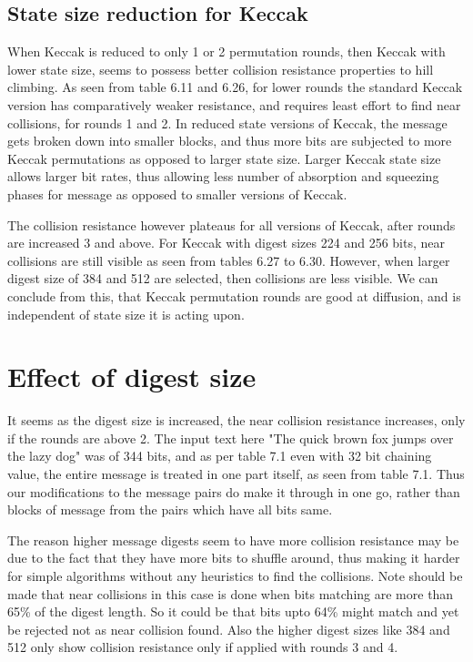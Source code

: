 \subsection{State size reduction for Keccak}

When Keccak is reduced to only 1 or 2 permutation rounds, then Keccak with lower state size, seems to possess better
collision resistance properties to hill climbing. As seen from table 6.11 and 6.26, for lower rounds the standard Keccak
version has comparatively weaker resistance, and requires least effort to find near collisions, for rounds 1 and 2.
In reduced state versions of Keccak, the message gets broken down into smaller blocks, and thus more bits are subjected
to more Keccak permutations as opposed to larger state size. Larger Keccak state size allows larger bit rates, thus
allowing less number of absorption and squeezing phases for message as opposed to smaller versions of Keccak.

The collision resistance however plateaus for all versions of Keccak, after rounds are increased 3 and above. For Keccak
with digest sizes 224 and 256 bits, near collisions are still visible as seen from tables 6.27 to 6.30. However, when 
larger digest size of 384 and 512 are selected, then collisions are less visible. We can conclude from this, that
Keccak permutation rounds are good at diffusion, and is independent of state size it is acting upon.

\section{Effect of digest size}

It seems as the digest size is increased, the near collision resistance increases, only if the rounds are above 2. The
input text here "The quick brown fox jumps over the lazy dog" was of 344 bits, and as per table 7.1 even with 32 bit
chaining value, the entire message is treated in one part itself, as seen from table 7.1. Thus our modifications to 
the message pairs do make it through in one go, rather than blocks of message from the pairs which have all bits same.

The reason higher message digests seem to have more collision resistance may be due to the fact that they have more
bits to shuffle around, thus making it harder for simple algorithms without any heuristics to find the collisions. Note
should be made that near collisions in this case is done when bits matching are more than 65\% of the digest length.
So it could be that bits upto 64\% might match and yet be rejected not as near collision found. Also the higher
digest sizes like 384 and 512 only show collision resistance only if applied with rounds 3 and 4.

